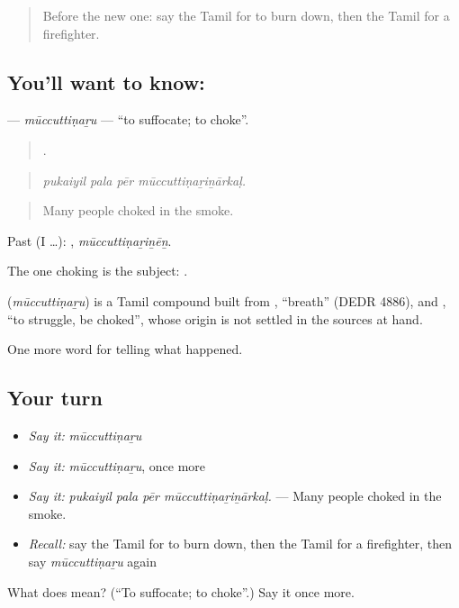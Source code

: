 \begin{quote}
Before the new one: say the Tamil for to burn down, then the Tamil for a firefighter.
\end{quote}

\subsection*{You'll want to know: }
\textbf{} — \emph{mūccuttiṇaṟu} — \textquotedblleft{}to suffocate; to choke\textquotedblright{}.

\begin{quote}
   .
\end{quote}

\begin{quote}
\emph{pukaiyil pala pēr mūccuttiṇaṟiṉārkaḷ.}
\end{quote}

\begin{quote}
Many people choked in the smoke.
\end{quote}

Past (I …): , \emph{mūccuttiṇaṟiṉēṉ}.

The one choking is the subject:  .

\begin{cousinweb}
\textbf{} (\emph{mūccuttiṇaṟu}) is a Tamil compound built from , \textquotedblleft{}breath\textquotedblright{} (DEDR 4886), and , \textquotedblleft{}to struggle, be choked\textquotedblright{}, whose origin is not settled in the sources at hand.
\end{cousinweb}

\begin{grammarlens}[title={What you've built}]
One more word for telling what happened.
\end{grammarlens}

\subsection*{Your turn}
\begin{itemize}
\raggedright
  \item \emph{Say it:} \emph{mūccuttiṇaṟu}
  \item \emph{Say it:} \emph{mūccuttiṇaṟu}, once more
  \item \emph{Say it:} \emph{pukaiyil pala pēr mūccuttiṇaṟiṉārkaḷ.} — Many people choked in the smoke.
  \item \emph{Recall:} say the Tamil for to burn down, then the Tamil for a firefighter, then say \emph{mūccuttiṇaṟu} again
\end{itemize}

\begin{tcolorbox}[breakable,colback=teal!4,colframe=teal!35!black,title={Before you move on}]
What does  mean? (\textquotedblleft{}To suffocate; to choke\textquotedblright{}.) Say it once more.
\end{tcolorbox}
